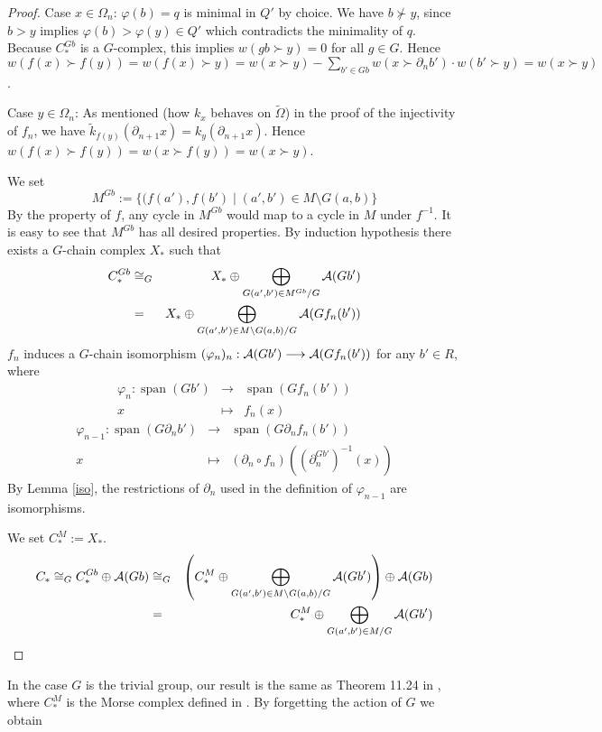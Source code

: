 \documentclass{elsarticle}
\def\span{\operatorname{span}}
\begin{document}
\begin{proof}
Case $x\in\Omega_n$: $\varphi(b)=q$ is minimal in $Q'$ by choice. We have $b\not\succ y$, since $b>y$ implies $\varphi(b)>\varphi(y)\in Q'$ which contradicts the minimality of $q$. Because $C_*^{Gb}$ is a $G$-complex, this implies $w(gb\succ y)=0$ for all $g\in G$. Hence $w(f(x)\succ f(y))=w(f(x)\succ y)=w(x\succ y)-\sum_{b'\in Gb} w(x\succ\partial_n b')\cdot w(b'\succ y)=w(x\succ y)$.

Case $y\in\Omega_n$: As mentioned (how $k_x$ behaves on $\widetilde\Omega$) in the proof of the injectivity of $f_n$, we have $\widetilde k_{f(y)}(\partial_{n+1} x)=k_y(\partial_{n+1} x)$. Hence $w(f(x)\succ f(y))=w(x\succ f(y))=w(x\succ y)$.

We set
\[
M^{Gb}:=\{(f(a'),f(b')\mid(a',b')\in M\setminus G(a,b)\}
\]
By the property of $f$, any cycle in $M^{Gb}$ would map to a cycle in $M$ under $f^{-1}$. It is easy to see that $M^{Gb}$ has all desired properties. By induction hypothesis there exists a $G$-chain complex $X_*$ such that
\begin{eqnarray*}
C_*^{Gb}&\cong_G&X_*\oplus\bigoplus_{G(a',b')\in M^{Gb}/G}{\cal A}(Gb')\\
&=&X_*\oplus\bigoplus_{G(a',b')\in M\setminus G(a,b)/G}{\cal A}(Gf_n(b'))
\end{eqnarray*}
$f_n$ induces a $G$-chain isomorphism $(\varphi_n)_n:{\cal A}(Gb')\longrightarrow{\cal A}(Gf_n(b'))$ for any $b'\in R$, where
\begin{eqnarray*}
\varphi_n:\span(Gb')&\longrightarrow&\span(Gf_n(b'))\\
x&\longmapsto&f_n(x)
\end{eqnarray*}
\begin{eqnarray*}
\varphi_{n-1}:\span(G\partial_nb')&\longrightarrow&\span(G\partial_nf_n(b'))\\
x&\longmapsto&(\partial_n\circ f_n)((\partial^{Gb'}_n)^{-1}(x))
\end{eqnarray*}
By Lemma \ref{iso}, the restrictions of $\partial_n$ used in the definition of $\varphi_{n-1}$ are isomorphisms.

We set $C_*^M:=X_*$.
\begin{eqnarray*}
C_*\cong_G C_*^{Gb}\oplus{\cal A}(Gb)&\cong_G&\left(C_*^M\oplus\bigoplus_{G(a',b')\in M\setminus G(a,b)/G}{\cal A}(Gb')\right)\oplus{\cal A}(Gb)\\
&=&C_*^M\oplus\bigoplus_{G(a',b')\in M/G}{\cal A}(Gb')
\end{eqnarray*}
\end{proof}
In the case $G$ is the trivial group, our result is the same as Theorem 11.24 in \cite[Chapter 11.3]{buch}, where $C_*^M$ is the Morse complex defined in \cite[Chapter 11.3]{buch}. By forgetting the action of $G$ we obtain
\end{document}
